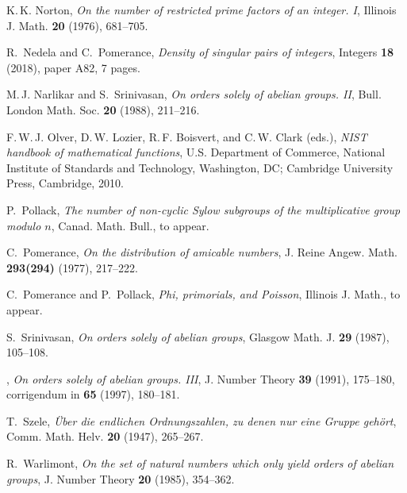 \documentclass[11pt]{amsart}
\theoremstyle{remark}
\begin{document}
\begin{thebibliography}{OLBC10}
{K.\,K.} Norton, \emph{On the number of restricted prime factors of an integer.
  {I}}, Illinois J. Math. \textbf{20} (1976), 681--705.

R.~Nedela and C.~Pomerance, \emph{Density of singular pairs of integers},
  Integers \textbf{18} (2018), paper A82, 7 pages.

{M.\,J.} Narlikar and S.~Srinivasan, \emph{On orders solely of abelian groups.
  {II}}, Bull. London Math. Soc. \textbf{20} (1988), 211--216.

{F.\,W.\,J.} Olver, {D.\,W.} Lozier, {R.\,F.} Boisvert, and {C.\,W.} Clark
  (eds.), \emph{N{IST} handbook of mathematical functions}, U.S. Department of
  Commerce, National Institute of Standards and Technology, Washington, DC;
  Cambridge University Press, Cambridge, 2010.

P.~Pollack, \emph{The number of non-cyclic {S}ylow subgroups of the
  multiplicative group modulo $n$}, Canad. Math. Bull., to appear.

C.~Pomerance, \emph{On the distribution of amicable numbers}, J. Reine Angew.
  Math. \textbf{293(294)} (1977), 217--222.

C.~Pomerance and P.~Pollack, \emph{Phi, primorials, and {P}oisson}, Illinois J.
  Math., to appear.

S.~Srinivasan, \emph{On orders solely of abelian groups}, Glasgow Math. J.
  \textbf{29} (1987), 105--108.

\bysame, \emph{On orders solely of abelian groups. {III}}, J. Number Theory
  \textbf{39} (1991), 175--180, corrigendum in \textbf{65} (1997), 180--181.

T.~Szele, \emph{\"{U}ber die endlichen {O}rdnungszahlen, zu denen nur eine
  {G}ruppe geh\"{o}rt}, Comm. Math. Helv. \textbf{20} (1947), 265--267.

R.~Warlimont, \emph{On the set of natural numbers which only yield orders of
  abelian groups}, J. Number Theory \textbf{20} (1985), 354--362.

\end{thebibliography}
\end{document}
